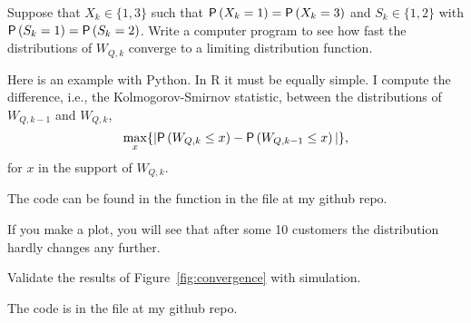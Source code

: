 \begin{exercise}
  Suppose that $X_k\in\{1,3\}$ such that $\P{X_k=1}=\P{X_k=3}$ and
  $S_k\in\{1,2\}$ with $\P{S_k=1}=\P{S_k=2}$. Write a computer program
  to see how fast the distributions of $W_{Q,k}$ converge to a limiting distribution function.
  \begin{solution}
Here is an example with Python. In R it must be equally simple.
I compute the  difference, i.e., the Kolmogorov-Smirnov statistic, between
the distributions of $W_{Q,k-1}$ and $W_{Q,k}$, 
\begin{equation*}
  \max_x\{ |\P{W_{Q,k}\leq x} - \P{W_{Q,k-1}\leq x}|\},
\end{equation*}
for $x$ in the support of $W_{Q,k}$. 

The code can be found in the  function in the file  at
my github repo.

If you make a plot, you will see that after some 10 customers the distribution hardly changes any further. 

  \end{solution}
  \end{exercise}

\begin{exercise}
  Validate the results of  Figure~\ref{fig:convergence} with simulation.
  \begin{solution}
    The code is in the file  at my github repo.
\end{solution}
\end{exercise}



